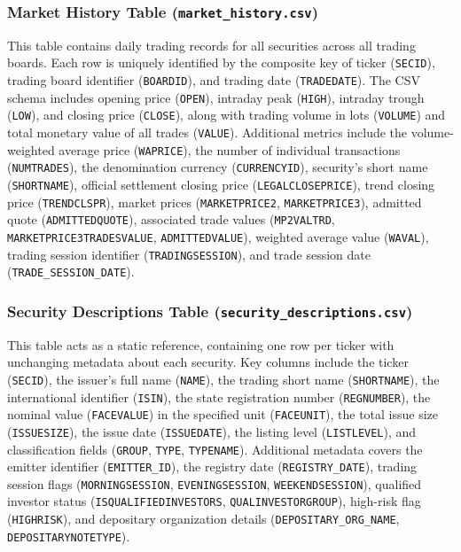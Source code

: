 \documentclass[oneside,final,12pt,a4paper]{extreport}
\begin{document}
\subsubsection{Market History Table (\texttt{market\_history.csv})}
This table contains daily trading records for all securities across all trading boards. Each row is uniquely identified by the composite key of ticker (\texttt{SECID}), trading board identifier (\texttt{BOARDID}), and trading date (\texttt{TRADEDATE}). The CSV schema includes opening price (\texttt{OPEN}), intraday peak (\texttt{HIGH}), intraday trough (\texttt{LOW}), and closing price (\texttt{CLOSE}), along with trading volume in lots (\texttt{VOLUME}) and total monetary value of all trades (\texttt{VALUE}). Additional metrics include the volume-weighted average price (\texttt{WAPRICE}), the number of individual transactions (\texttt{NUMTRADES}), the denomination currency (\texttt{CURRENCYID}), security's short name (\texttt{SHORTNAME}), official settlement closing price (\texttt{LEGALCLOSEPRICE}), trend closing price (\texttt{TRENDCLSPR}), market prices (\texttt{MARKETPRICE2}, \texttt{MARKETPRICE3}), admitted quote (\texttt{ADMITTEDQUOTE}), associated trade values (\texttt{MP2VALTRD}, \texttt{MARKETPRICE3TRADESVALUE}, \texttt{ADMITTEDVALUE}), weighted average value (\texttt{WAVAL}), trading session identifier (\texttt{TRADINGSESSION}), and trade session date (\texttt{TRADE\_SESSION\_DATE}).

\subsubsection{Security Descriptions Table (\texttt{security\_descriptions.csv})}
This table acts as a static reference, containing one row per ticker with unchanging metadata about each security. Key columns include the ticker (\texttt{SECID}), the issuer's full name (\texttt{NAME}), the trading short name (\texttt{SHORTNAME}), the international identifier (\texttt{ISIN}), the state registration number (\texttt{REGNUMBER}), the nominal value (\texttt{FACEVALUE}) in the specified unit (\texttt{FACEUNIT}), the total issue size (\texttt{ISSUESIZE}), the issue date (\texttt{ISSUEDATE}), the listing level (\texttt{LISTLEVEL}), and classification fields (\texttt{GROUP}, \texttt{TYPE}, \texttt{TYPENAME}). Additional metadata covers the emitter identifier (\texttt{EMITTER\_ID}), the registry date (\texttt{REGISTRY\_DATE}), trading session flags (\texttt{MORNINGSESSION}, \texttt{EVENINGSESSION}, \texttt{WEEKENDSESSION}), qualified investor status (\texttt{ISQUALIFIEDINVESTORS}, \texttt{QUALINVESTORGROUP}), high-risk flag (\texttt{HIGHRISK}), and depositary organization details (\texttt{DEPOSITARY\_ORG\_NAME}, \texttt{DEPOSITARYNOTETYPE}).
\end{document}
